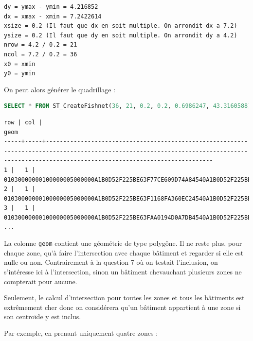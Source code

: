 \documentclass[12pt,a4paper]{article}
\begin{document}
\begin{lstlisting}
dy = ymax - ymin = 4.216852
dx = xmax - xmin = 7.2422614
xsize = 0.2 (Il faut que dx en soit multiple. On arrondit dx a 7.2)
ysize = 0.2 (Il faut que dy en soit multiple. On arrondit dy a 4.2)
nrow = 4.2 / 0.2 = 21
ncol = 7.2 / 0.2 = 36
x0 = xmin
y0 = ymin
\end{lstlisting}

On peut alors générer le quadrillage :

\begin{lstlisting}[language=SQL]
SELECT * FROM ST_CreateFishnet(36, 21, 0.2, 0.2, 0.6986247, 43.3160588);
\end{lstlisting}

\begin{lstlisting}
row | col |                                                                                            geom                                                                                            
-----+-----+--------------------------------------------------------------------------------------------------------------------------------------------------------------------------------------------
1 |   1 | 01030000000100000005000000A1B0D52F225BE63F77CE609D74A84540A1B0D52F225BE63F1168FA360EC2454008173C9688C1EC3F1168FA360EC2454008173C9688C1EC3F77CE609D74A84540A1B0D52F225BE63F77CE609D74A84540
2 |   1 | 01030000000100000005000000A1B0D52F225BE63F1168FA360EC24540A1B0D52F225BE63FAB0194D0A7DB454008173C9688C1EC3FAB0194D0A7DB454008173C9688C1EC3F1168FA360EC24540A1B0D52F225BE63F1168FA360EC24540
3 |   1 | 01030000000100000005000000A1B0D52F225BE63FAA0194D0A7DB4540A1B0D52F225BE63F449B2D6A41F5454008173C9688C1EC3F449B2D6A41F5454008173C9688C1EC3FAA0194D0A7DB4540A1B0D52F225BE63FAA0194D0A7DB4540
...
\end{lstlisting}

La colonne \verb?geom? contient une géométrie de type polygône. Il ne reste plus,
pour chaque zone, qu'à faire l'intersection avec chaque bâtiment et regarder si
elle est nulle ou non. Contrairement à la question 7 où on testait l'inclusion,
on s'intéresse ici à l'intersection, sinon un bâtiment chevauchant plusieurs
zones ne compterait pour aucune.

Seulement, le calcul d'intersection pour toutes les zones et tous les bâtiments
est extrêmement cher donc on considérera qu'un bâtiment appartient à une
zone si son centroïde y est inclus.

Par exemple, en prenant uniquement quatre zones :
\end{document}
